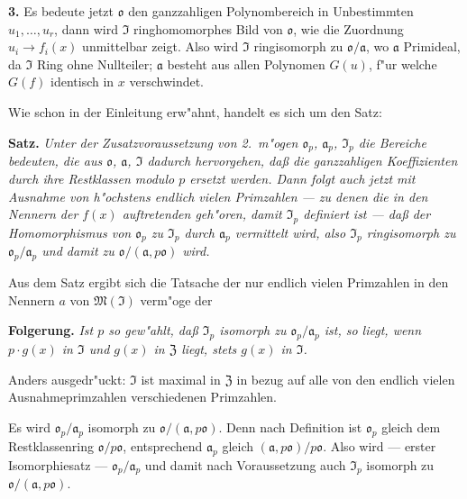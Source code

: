\medskip\noindent\textbf{3.}
Es bedeute jetzt $\mathfrak{o}$ den ganzzahligen Polynombereich in Unbestimmten $u_1,\ldots,u_r$, dann wird $\mathfrak{I}$ ringhomomorphes Bild von $\mathfrak{o}$, wie die Zuordnung $u_i \to f_i(x)$ unmittelbar zeigt. Also wird $\mathfrak{I}$ ringisomorph zu $\mathfrak{o}/\mathfrak{a}$, wo $\mathfrak{a}$ Primideal, da $\mathfrak{I}$ Ring ohne Nullteiler; $\mathfrak{a}$ besteht aus allen Polynomen $G(u)$, f"ur welche $G(f)$ identisch in $x$ verschwindet.

Wie schon in der Einleitung erw"ahnt, handelt es sich um den Satz:

\medskip\noindent\textbf{Satz.}
\textit{Unter der Zusatzvoraussetzung von 2.\ m"ogen $\mathfrak{o}_p$, $\mathfrak{a}_p$, $\mathfrak{I}_p$ die Bereiche bedeuten, die aus $\mathfrak{o}$, $\mathfrak{a}$, $\mathfrak{I}$ dadurch hervorgehen, da\ss{} die ganzzahligen Koeffizienten durch ihre Restklassen modulo $p$ ersetzt werden. Dann folgt auch jetzt mit Ausnahme von h"ochstens endlich vielen Primzahlen --- zu denen die in den Nennern der $f(x)$ auftretenden geh"oren, damit $\mathfrak{I}_p$ definiert ist --- da\ss{} der Homomorphismus von $\mathfrak{o}_p$ zu $\mathfrak{I}_p$ durch $\mathfrak{a}_p$ vermittelt wird, also $\mathfrak{I}_p$ ringisomorph zu $\mathfrak{o}_p/\mathfrak{a}_p$ und damit zu $\mathfrak{o}/(\mathfrak{a}, p\mathfrak{o})$ wird.}

Aus dem Satz ergibt sich die Tatsache der nur endlich vielen Primzahlen in den Nennern $a$ von $\mathfrak{M}(\mathfrak{I})$ verm"oge der

\medskip\noindent\textbf{Folgerung.}
\textit{Ist $p$ so gew"ahlt, da\ss{} $\mathfrak{I}_p$ isomorph zu $\mathfrak{o}_p/\mathfrak{a}_p$ ist, so liegt, wenn $p \cdot g(x)$ in $\mathfrak{I}$ und $g(x)$ in $\mathfrak{Z}$ liegt, stets $g(x)$ in $\mathfrak{I}$.}

Anders ausgedr"uckt: $\mathfrak{I}$ ist maximal in $\mathfrak{Z}$ in bezug auf alle von den endlich vielen Ausnahmeprimzahlen verschiedenen Primzahlen.

Es wird $\mathfrak{o}_p/\mathfrak{a}_p$ isomorph zu $\mathfrak{o}/(\mathfrak{a}, p\mathfrak{o})$. Denn nach Definition ist $\mathfrak{o}_p$ gleich dem Restklassenring $\mathfrak{o}/p\mathfrak{o}$, entsprechend $\mathfrak{a}_p$ gleich $(\mathfrak{a}, p\mathfrak{o})/p\mathfrak{o}$. Also wird --- erster Isomorphiesatz --- $\mathfrak{o}_p/\mathfrak{a}_p$ und damit nach Voraussetzung auch $\mathfrak{I}_p$ isomorph zu $\mathfrak{o}/(\mathfrak{a}, p\mathfrak{o})$.

